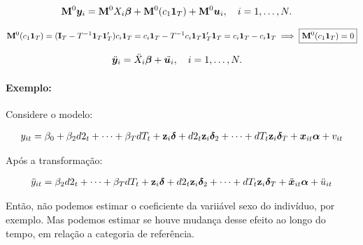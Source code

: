 \documentclass[11pt, oneside, a4paper, article]{article}
\numberwithin{equation}{section}
\begin{document}
\vspace{-1 em}
\begin{align*} 
\mathbf{M}^{0} \boldsymbol{y}_{i} &= \mathbf{M}^{0} X_{i} \boldsymbol{\beta} + \mathbf{M}^{0} ( c_{1} \boldsymbol{1}_{T} ) + \mathbf{M}^{0} \boldsymbol{u}_{i},
\quad i = 1, \dots, N.
\end{align*}

\vspace{-1 em}
\begin{align*} 
\mathbf{M}^{0} ( c_{1} \boldsymbol{1}_{T} ) = 
( \mathbf{I}_{T} - T^{-1} \boldsymbol{1}_{T} \boldsymbol{1}_{T}' ) c_{i} \boldsymbol{1}_{T} 
=
c_{i} \boldsymbol{1}_{T} - T^{-1} c_{i} \boldsymbol{1}_{T} \boldsymbol{1}_{T}' \boldsymbol{1}_{T} 
=
c_{i} \boldsymbol{1}_{T} - c_{i} \boldsymbol{1}_{T} 
\implies
\boxed{ \mathbf{M}^{0} ( c_{1} \boldsymbol{1}_{T} ) = 0 }
\end{align*}

\vspace{-1 em}
\begin{align} \label{mod2:FE}
\ddot{\boldsymbol{y}}_{i} &= \ddot{X}_{i} \boldsymbol{\beta} + \ddot{\boldsymbol{u}_{i}},
\quad i = 1, \dots, N.
\end{align}

\paragraph{Exemplo:} Considere o modelo:

\vspace{-1.5 em}
\begin{align*}
y_{it} =
\beta_{0} + \beta_{2} d2_{t} + \dots + \beta_{T} dT_{t}
+
\mathbf{z}_{i} \boldsymbol{\delta} + d2_{t} \mathbf{z}_{i} \boldsymbol{\delta}_2  + \dots + dT_{t} \mathbf{z}_{i} \boldsymbol{\delta}_{T} + 
\boldsymbol{x}_{it} \boldsymbol{\alpha} + v_{it}
\end{align*}

Após a transformação:

\vspace{-1.5 em}
\begin{align*}
\ddot{y}_{it} =
\beta_{2} d2_{t} + \dots + \beta_{T} dT_{t}
+
\mathbf{z}_{i} \boldsymbol{\delta} + d2_{t} \mathbf{z}_{i} \boldsymbol{\delta}_2  + \dots + dT_{t} \mathbf{z}_{i} \boldsymbol{\delta}_{T} + 
\ddot{\boldsymbol{x}}_{it} \boldsymbol{\alpha} + \ddot{u}_{it}
\end{align*}

Então, não podemos estimar o coeficiente da variiável sexo do indivíduo, por exemplo.
Mas podemos estimar se houve mudança desse efeito ao longo do tempo, em relação a categoria de referência.


\end{document}
